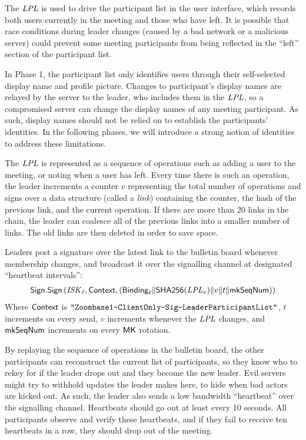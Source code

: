 The $\mathit{LPL}$ is used to drive the participant list in the user interface, which records both users
currently in the meeting and those who have left. It is possible that race conditions during leader
changes (caused by a bad network or a malicious server) could prevent some meeting participants from
being reflected in the ``left'' section of the participant list.

In Phase 1, the participant list only identifies users through their self-selected display name and
profile picture. Changes to participant's display names are relayed by the server to the leader, who
includes them in the $\mathit{LPL}$, so a compromised server can change the display names of any meeting
participant. As such, display names should not be relied on to establish the participants'
identities. In the following phases, we will introduce a strong notion of identities to address
these limitations.

The $\mathit{LPL}$ is represented as a sequence of operations such as adding a user to the meeting, or noting when a user has left. Every time there is such an operation, the leader increments a counter $v$ representing the total number of operations and signs over a data structure (called a \textit{link}) containing the counter, the hash of the previous link, and the current operation. If there are more than 20 links in the chain, the leader can coalesce all of the previous links into a smaller number of links. The old links are then deleted in order to save space.

Leaders post a signature over the latest link to the bulletin board whenever membership changes, and broadcast it over the signalling channel at designated ``heartbeat intervals'':
%
\begin{align*}
{\sf Sign}.\mathsf{Sign} \left(\mathit{ISK}_{\ell}, {\sf Context}, ({\sf Binding}_{\ell} \| \mathsf{SHA256}(\mathit{LPL}_v) \| v \| t \| \mathsf{mkSeqNum} ) \right)
\end{align*}
%
Where ${\sf Context}$ is $\texttt{"Zoombase1-ClientOnly-Sig-Leader\-Participant\-List"}$, $t$ increments on every send, $v$ increments whenever the $\mathit{LPL}$ changes, and $\mathsf{mkSeqNum}$ increments on every ${\sf MK}$ rotation.

By replaying the sequence of operations in the bulletin board, the other participants can reconstruct the current list of participants, so they know who to rekey for if the leader drops out and they become the new leader. Evil servers might try to withhold updates the leader makes here, to hide when bad actors are kicked out. As such, the leader also sends a low bandwidth ``heartbeat'' over the signalling channel. Heartbeats should go out at least every 10 seconds. All participants observe and verify these heartbeats, and if they fail to receive ten heartbeats in a row, they should drop out of the meeting.

